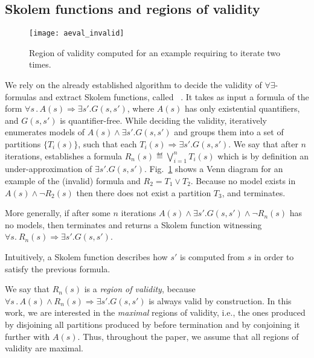 \subsection{Skolem functions and regions of validity}
\label{sec:aeval}

\begin{figure}[!t]
\centering
\texttt{[image: aeval\_invalid]}
\caption{Region of validity computed for an example requiring \aeval to iterate two times.}
\label{fg:aeval}
\end{figure}


We rely on the already established algorithm to decide the validity of $\forall\exists$-formulas and extract Skolem functions, called \aeval~\cite{fedyukovich2015automated}.
It takes as input a formula of the form $\forall s \,.\,  A(s) \Rightarrow \exists s' . G(s,s')$,
where $A(s)$ has only existential quantifiers, and $G(s,s')$ is quantifier-free.
While deciding the validity, \aeval iteratively enumerates models of
$A(s) \land \exists s'. G(s, s')$ and groups them into a set of partitions $\{T_i(s)\}$, such that each $T_i(s) \Rightarrow \exists s' . G (s, s')$.
We say that after $n$ iterations, \aeval establishes a formula $R_n(s) \eqdef \bigvee_{i=1}^n T_i(s)$ which is by definition an under-approximation of $\exists s' . G (s, s')$.
Fig.~\ref{fg:aeval} shows a Venn diagram for an example of the (invalid) formula and $R_2 = T_1 \lor T_2$.
Because no model exists in $A(s) \land \neg{R_2(s)}$ then there does not exist a partition $T_3$, and \aeval terminates.

More generally, if after some $n$ iterations
$A(s) \land \exists s'. G(s, s') \land \neg R_n(s)$ has no models,
then \aeval terminates and returns a Skolem function witnessing
$\forall s.~ R_n(s) \Rightarrow \exists s' .
G(s,s')$.
\iffalse
~\cite{katis2016synthesis}.
\fi 
Intuitively, a Skolem function
describes how $s'$ is computed from $s$ in order to satisfy the
previous formula.

We say that $R_n(s)$ is a \emph{region of validity}, because $\forall s \,.\,  A(s) \land R_n(s) \Rightarrow \exists s' . G(s,s')$ is always valid by construction.
In this work, we are interested in the \emph{maximal} regions of validity, i.e., the ones produced by disjoining all partitions produced by \aeval before termination and by conjoining it further with $A(s)$.
Thus, throughout the paper, we assume that all regions of validity are maximal.

